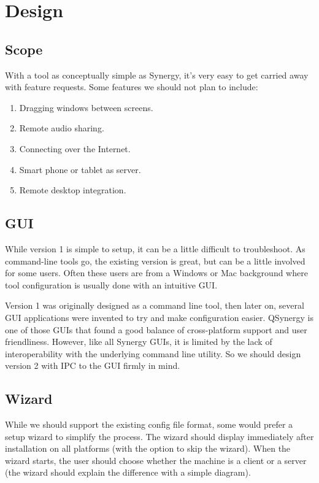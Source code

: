 \documentclass{article}
\begin{document}
\section{Design}

\subsection{Scope}

With a tool as conceptually simple as Synergy, it's very easy to get carried
away with feature requests. Some features we should not plan to include:

\begin{enumerate}
  \item Dragging windows between screens.
  \item Remote audio sharing.
  \item Connecting over the Internet.
  \item Smart phone or tablet as server.
  \item Remote desktop integration.
\end{enumerate}

\subsection{GUI}

While version 1 is simple to setup, it can be a little difficult to
troubleshoot. As command-line tools go, the existing version is great, but
can be a little involved for some users. Often these users are from a Windows
or Mac background where tool configuration is usually done with an intuitive
GUI.

Version 1 was originally designed as a command line tool, then later on, several
GUI applications were invented to try and make configuration easier. QSynergy is
one of those GUIs that found a good balance of cross-platform support and user 
friendliness. However, like all Synergy GUIs, it is limited by the lack of 
interoperability with the underlying command line utility. So we should design 
version 2 with IPC to the GUI firmly in mind.

\subsection{Wizard}

While we should support the existing config file format, some would prefer a
setup wizard to simplify the process. The wizard should display immediately
after installation on all platforms (with the option to skip the wizard). When
the wizard starts, the user should choose whether the machine is a client or a
server (the wizard should explain the difference with a simple diagram).
\end{document}
